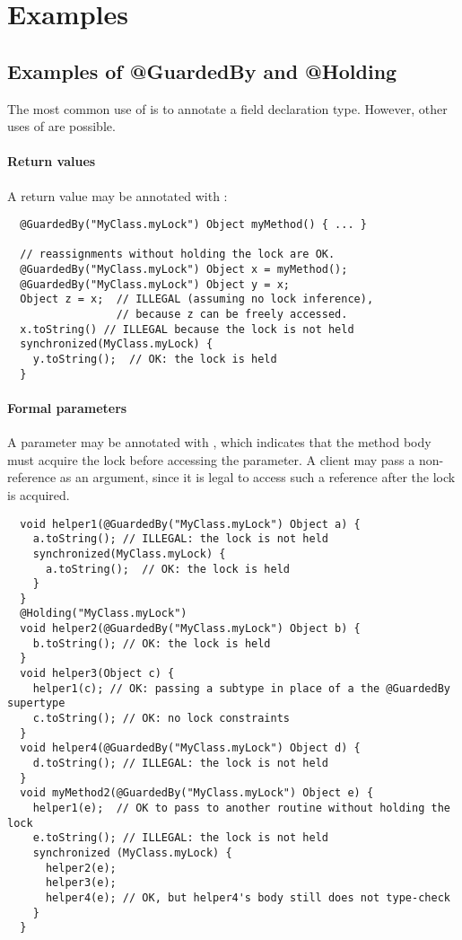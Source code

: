 \section{Examples\label{lock-examples}}

\subsection{Examples of @GuardedBy and @Holding}

The most common use of  is to annotate a field declaration
type.  However, other uses of  are possible.

\paragraph{Return values}

A return value may be annotated with :

\begin{Verbatim}
  @GuardedBy("MyClass.myLock") Object myMethod() { ... }

  // reassignments without holding the lock are OK.
  @GuardedBy("MyClass.myLock") Object x = myMethod();
  @GuardedBy("MyClass.myLock") Object y = x;
  Object z = x;  // ILLEGAL (assuming no lock inference),
                 // because z can be freely accessed.
  x.toString() // ILLEGAL because the lock is not held
  synchronized(MyClass.myLock) {
    y.toString();  // OK: the lock is held
  }
\end{Verbatim}

\paragraph{Formal parameters}

A parameter may be annotated with , which indicates that
the method body must acquire the lock before accessing the parameter.  A
client may pass a non- reference as an argument, since it
is legal to access such a reference after the lock is acquired.

\begin{Verbatim}
  void helper1(@GuardedBy("MyClass.myLock") Object a) {
    a.toString(); // ILLEGAL: the lock is not held
    synchronized(MyClass.myLock) {
      a.toString();  // OK: the lock is held
    }
  }
  @Holding("MyClass.myLock")
  void helper2(@GuardedBy("MyClass.myLock") Object b) {
    b.toString(); // OK: the lock is held
  }
  void helper3(Object c) {
    helper1(c); // OK: passing a subtype in place of a the @GuardedBy supertype
    c.toString(); // OK: no lock constraints
  }
  void helper4(@GuardedBy("MyClass.myLock") Object d) {
    d.toString(); // ILLEGAL: the lock is not held
  }
  void myMethod2(@GuardedBy("MyClass.myLock") Object e) {
    helper1(e);  // OK to pass to another routine without holding the lock
    e.toString(); // ILLEGAL: the lock is not held
    synchronized (MyClass.myLock) {
      helper2(e);
      helper3(e);
      helper4(e); // OK, but helper4's body still does not type-check
    }
  }
\end{Verbatim}

